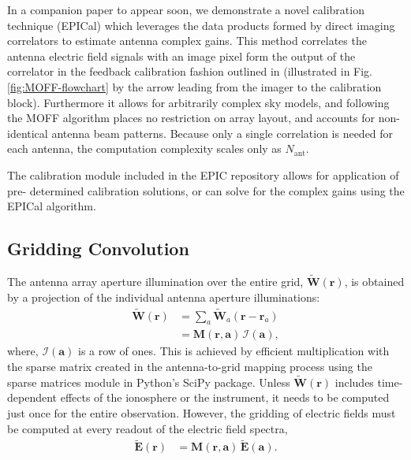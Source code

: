\documentclass[a4paper,fleqn,usenatbib]{../mnras}
\begin{document}
In a companion paper to appear soon, we demonstrate a novel calibration 
technique (EPICal) which leverages the data products formed by direct imaging 
correlators to estimate antenna complex gains. This method correlates the antenna 
electric field signals with an image pixel form the output of the correlator in the 
feedback calibration fashion outlined in \citealt{mor11} (illustrated in Fig. 
\ref{fig:MOFF-flowchart} by the arrow leading from the imager to the calibration 
block). Furthermore it allows for arbitrarily complex sky models, and following the 
MOFF algorithm places no restriction on array layout, and accounts for non-identical 
antenna beam patterns. Because only a single correlation is needed for each 
antenna, the computation complexity scales only as $N_{\mathrm{ant}}$. 

The calibration module included in the EPIC repository allows for application of pre-
determined calibration solutions, or can solve for the complex gains using the 
EPICal algorithm.

\subsection{Gridding Convolution}

The antenna array aperture illumination over the entire grid,
$\widetilde{\mathbf{W}}(\mathbf{r})$, is obtained by a projection of the individual
antenna aperture illuminations:
\begin{align}\label{eqn:gridding-convolution}
  \widetilde{\mathbf{W}}(\mathbf{r}) &= \sum_a \widetilde{\mathbf{W}}_a(\mathbf{r}-\mathbf{r}_a) \\
                            &= \mathbf{M}(\mathbf{r},\mathbf{a})\,\mathcal{I}(\mathbf{a}),
\end{align}
where, $\mathcal{I}(\mathbf{a})$ is a row of ones. This is achieved by
efficient multiplication with the sparse matrix created in the antenna-to-grid
mapping process using the sparse matrices module in Python's SciPy package. 
Unless $\widetilde{\mathbf{W}}(\mathbf{r})$ includes time-dependent
effects of the ionosphere or the instrument, it needs to be computed just once
for the entire observation. However, the gridding of electric fields must be
computed at every readout of the electric field spectra,
\begin{align}
  \widetilde{\mathbf{E}}(\mathbf{r}) &= \mathbf{M}(\mathbf{r},\mathbf{a})\,\widetilde{\mathbf{E}}(\mathbf{a}).
\end{align}
\end{document}
